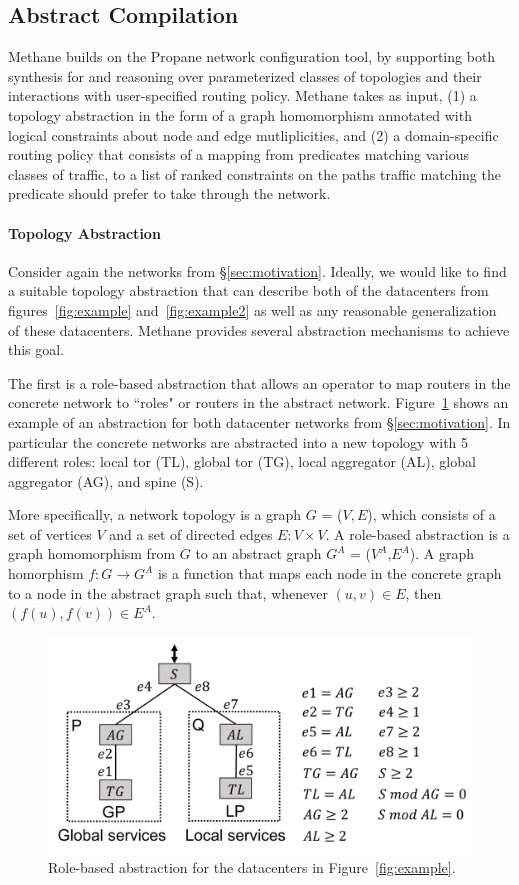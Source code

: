 \documentclass{sig-alternate-10pt}
\newcommand{\sysname}{{\small \sf Methane}\xspace}
\newcommand{\para}[1]{\paragraph*{\textbf{#1}}}
\begin{document}
\subsection{Abstract Compilation}

\sysname builds on the Propane network configuration tool, by supporting both synthesis for and reasoning over parameterized classes of topologies and their interactions with user-specified routing policy. 
\sysname takes as input, (1) a topology abstraction in the form of a graph homomorphism annotated with logical constraints about node and edge mutliplicities, and (2) a domain-specific routing policy that consists of a mapping from predicates matching various classes of traffic, to a list of ranked constraints on the paths traffic matching the predicate should prefer to take through the network.

\para{Topology Abstraction}

Consider again the networks from \S\ref{sec:motivation}. Ideally, we would like
to find a suitable topology abstraction that can describe both of the datacenters from figures~\ref{fig:example} and~\ref{fig:example2} as well as any reasonable generalization of these datacenters. \sysname provides several abstraction mechanisms to achieve this goal. 

The first is a role-based abstraction that allows an operator to map routers in the concrete network to ``roles" or routers in the abstract network. Figure~\ref{fig:example3} shows an example of an abstraction for both datacenter networks from \S\ref{sec:motivation}. In particular the concrete networks are abstracted into a new topology with 5 different roles: local tor (TL), global tor (TG), local aggregator (AL), global aggregator (AG), and spine (S). 

More specifically, a network topology is a graph $G$ = ($V, E$), which consists of a set of vertices $V$ and a set of directed edges $E \colon V \times V$. A role-based abstraction is a graph homomorphism from $G$ to an abstract graph $G^A$ = ($V^A$,$E^A$). A graph homorphism $f : G \rightarrow G^A$ is a function that maps each node in the concrete graph to a node in the abstract graph such that, whenever $(u,v) \in E$, then $(f(u),f(v)) \in E^A$. 


\begin{figure}[t!]
  \centering
  \includegraphics[width=\columnwidth]{figures/example3}
  \caption{Role-based abstraction for the datacenters in Figure~\ref{fig:example}.}
  \label{fig:example3}
  \vspace{-1em}
\end{figure}
\end{document}
